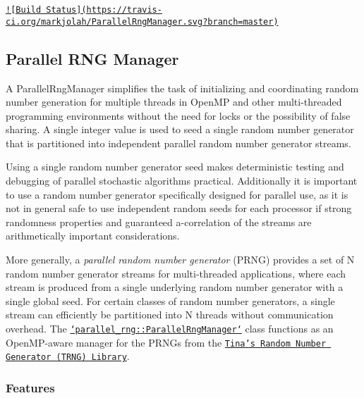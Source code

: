\href{https://travis-ci.org/markjolah/ParallelRngManager}{\tt !\mbox{[}Build Status\mbox{]}(https\-://travis-\/ci.\-org/markjolah/\-Parallel\-Rng\-Manager.\-svg?branch=master)}

\subsection*{Parallel R\-N\-G Manager}

A Parallel\-Rng\-Manager simplifies the task of initializing and coordinating random number generation for multiple threads in Open\-M\-P and other multi-\/threaded programming environments without the need for locks or the possibility of false sharing. A single integer value is used to seed a single random number generator that is partitioned into independent parallel random number generator streams.

Using a single random number generator seed makes deterministic testing and debugging of parallel stochastic algorithms practical. Additionally it is important to use a random number generator specifically designed for parallel use, as it is not in general safe to use independent random seeds for each processor if strong randomness properties and guaranteed a-\/correlation of the streams are arithmetically important considerations.

More generally, a {\itshape parallel random number generator} (P\-R\-N\-G) provides a set of N random number generator streams for multi-\/threaded applications, where each stream is produced from a single underlying random number generator with a single global seed. For certain classes of random number generators, a single stream can efficiently be partitioned into N threads without communication overhead. The \href{https://markjolah.github.io/ParallelRngManager/classparallel__rng_1_1ParallelRngManager.html}{\tt `parallel\-\_\-rng\-::\-Parallel\-Rng\-Manager`} class functions as an Open\-M\-P-\/aware manager for the P\-R\-N\-Gs from the \href{https://www.numbercrunch.de/trng/}{\tt Tina's Random Number Generator (T\-R\-N\-G) Library}.

\subsubsection*{Features}



